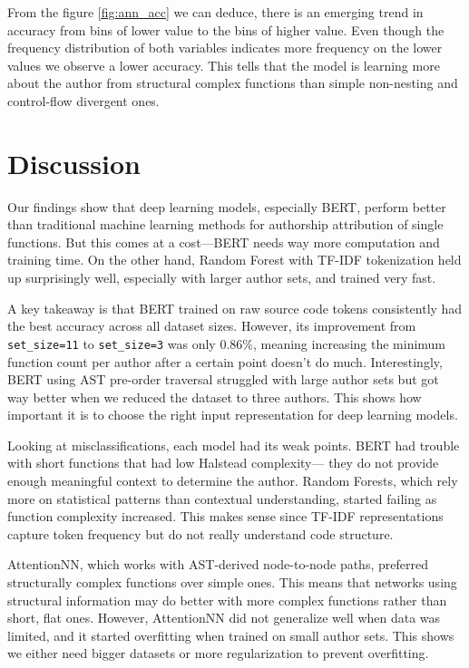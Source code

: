\documentclass[conference]{IEEEtran}
\begin{document}
From the figure \ref{fig:ann_acc} we can deduce, there is an emerging trend in accuracy from bins of lower value to the bins of higher value.
Even though the frequency distribution of both variables indicates more frequency on the lower values we observe a lower
accuracy. This tells that the model is learning more about the author from structural complex functions than simple non-nesting and 
control-flow divergent ones.

\section{Discussion}

Our findings show that deep learning models, especially BERT, perform better than traditional machine learning methods for authorship attribution 
of single functions. But this comes at a cost—BERT needs way more computation and training time. On the other hand, Random Forest with TF-IDF 
tokenization held up surprisingly well, especially with larger author sets, and trained very fast.

A key takeaway is that BERT trained on raw source code tokens consistently had the best accuracy across all dataset sizes. However, 
its improvement from \texttt{set\_size=11} to \texttt{set\_size=3} was only 0.86\%, meaning increasing the minimum function count per author 
after a certain point doesn’t do much. Interestingly, BERT using AST pre-order traversal struggled with large author sets but got way better 
when we reduced the dataset to three authors. This shows how important it is to choose the right input representation for deep learning models.

Looking at misclassifications, each model had its weak points. BERT had trouble with short functions that had low Halstead complexity— they 
do not provide enough meaningful context to determine the author. Random Forests, which rely more on statistical patterns than contextual 
understanding, started failing as function complexity increased. This makes sense since TF-IDF representations capture token frequency but 
do not really understand code structure.

AttentionNN, which works with AST-derived node-to-node paths, preferred structurally complex functions over simple ones. This means that 
networks using structural information may do better with more complex functions rather than short, flat ones. However, AttentionNN did not 
generalize well when data was limited, and it started overfitting when trained on small author sets. This shows we either need bigger 
datasets or more regularization to prevent overfitting.
\end{document}
